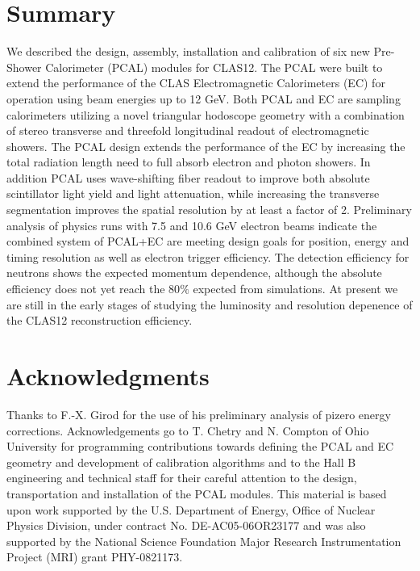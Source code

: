 \section{Summary}
We described the design, assembly, installation and calibration of six new Pre-Shower Calorimeter (PCAL) modules for CLAS12.  The PCAL were built to extend the performance of the CLAS Electromagnetic Calorimeters (EC) for operation using beam energies up to 12 GeV.  Both PCAL and EC are sampling calorimeters utilizing a novel triangular hodoscope geometry with a combination of stereo transverse and threefold longitudinal readout of electromagnetic showers.  The PCAL design extends the performance of the EC by increasing the total radiation length need to full absorb electron and photon showers.  In addition PCAL uses wave-shifting fiber readout to improve both absolute scintillator light yield and light attenuation, while increasing the transverse segmentation improves the spatial resolution by at least a factor of 2.    Preliminary analysis of physics runs with 7.5 and 10.6 GeV electron beams indicate the combined system of PCAL+EC are meeting design goals for position, energy and timing resolution as well as electron trigger efficiency.  The detection efficiency for neutrons shows the expected momentum dependence, although the absolute efficiency does not yet reach the 80$\%$ expected from simulations.  At present we are still in the early stages of studying the luminosity and resolution depenence of the CLAS12 reconstruction efficiency.

\section*{Acknowledgments}

Thanks to F.-X. Girod for the use of his preliminary analysis of pizero energy corrections.  Acknowledgements go to T. Chetry and N. Compton of Ohio University for programming contributions towards defining the PCAL and EC geometry and development of  calibration algorithms and to the Hall B engineering and technical staff for their careful attention to the design, transportation and installation of the PCAL modules.
This material is based upon work supported by the U.S. Department of Energy, Office of Nuclear Physics Division, under contract No. DE-AC05-06OR23177 and was also supported by the National Science Foundation Major Research Instrumentation Project (MRI) grant PHY-0821173.





